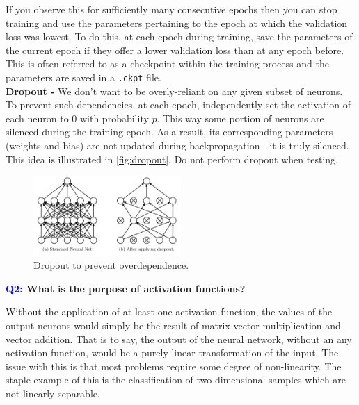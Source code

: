\documentclass[11pt]{article}
\begin{document}
\noindent If you observe this for sufficiently many consecutive epochs then you can stop training and use the parameters pertaining to the epoch at which the validation loss was lowest. To do this, at each epoch during training, save the parameters of the current epoch if they offer a lower validation loss than at any epoch before. This is often referred to as a checkpoint within the training process and the parameters are saved in a \texttt{.ckpt} file.\\

\noindent\textbf{Dropout -} We don't want to be overly-reliant on any given subset of neurons. To prevent such dependencies, at each epoch, independently set the activation of each neuron to 0 with probability $p$. This way some portion of neurons are silenced during the training epoch. As a result, its corresponding parameters (weights and bias) are not updated during backpropagation - it is truly silenced. This idea is illustrated in \autoref{fig:dropout}. Do not perform dropout when testing.

\begin{figure}[ht]
    \centering
    \includegraphics[width=0.5\textwidth]{./figures/neural_nets/dropout.png}
    \caption{Dropout to prevent overdependence.}
    \label{fig:dropout}
\end{figure}

\begin{center}
    \textbf{\textcolor{blue}{Q2:} What is the purpose of activation functions?}
\end{center}
Without the application of at least one activation function, the values of the output neurons would simply be the result of matrix-vector multiplication and vector addition. That is to say, the output of the neural network, without an any activation function, would be a purely linear transformation of the input. The issue with this is that most problems require some degree of non-linearity. The staple example of this is the classification of two-dimensional samples which are not linearly-separable.
\end{document}
